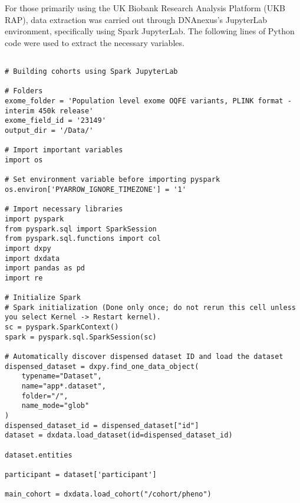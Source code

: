 \documentclass[11pt]{article}
\begin{document}
For those primarily using the UK Biobank Research Analysis Platform (UKB RAP), data extraction was carried out through DNAnexus's JupyterLab environment, specifically using Spark JupyterLab. The following lines of Python code were used to extract the necessary variables.

\color{violet}
\begin{lstlisting}[style=PythonStyle]

# Building cohorts using Spark JupyterLab

# Folders  
exome_folder = 'Population level exome OQFE variants, PLINK format - interim 450k release'
exome_field_id = '23149'
output_dir = '/Data/'

# Import important variables
import os

# Set environment variable before importing pyspark
os.environ['PYARROW_IGNORE_TIMEZONE'] = '1'

# Import necessary libraries
import pyspark
from pyspark.sql import SparkSession
from pyspark.sql.functions import col
import dxpy
import dxdata
import pandas as pd
import re

# Initialize Spark
# Spark initialization (Done only once; do not rerun this cell unless you select Kernel -> Restart kernel).
sc = pyspark.SparkContext()
spark = pyspark.sql.SparkSession(sc)

# Automatically discover dispensed dataset ID and load the dataset
dispensed_dataset = dxpy.find_one_data_object(
    typename="Dataset", 
    name="app*.dataset", 
    folder="/", 
    name_mode="glob"
)
dispensed_dataset_id = dispensed_dataset["id"]
dataset = dxdata.load_dataset(id=dispensed_dataset_id)

dataset.entities

participant = dataset['participant']

main_cohort = dxdata.load_cohort("/cohort/pheno")


\end{lstlisting}
\end{document}
